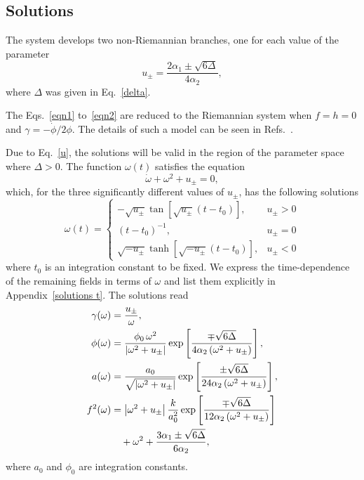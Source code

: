 \documentclass[aps,prd,12pt,superscriptaddress,showpacs,showkeys,longbibliography,reprint,nofootinbib]{revtex4-1}
\begin{document}
\subsection{Solutions\label{sec:sol}}

The system develops two non-Riemannian branches, one for each value of the parameter
\begin{equation}
  \label{u}
  u_\pm=\frac{2\alpha_1\pm\sqrt{6\Delta}}{4\alpha_2},
\end{equation}
where $\Delta$ was given in Eq.~\eqref{delta}.

The Eqs.~\eqref{eqn1} to~\eqref{eqn2} are reduced to the Riemannian system when \mbox{$f=h=0$} and \mbox{$\gamma=-\dot{\phi}/2\phi$}. The details of such a model can be seen in Refs.~\cite{Deruelle:1986iv,Deruelle:2003ck,Henriques:1986jw,*Ishihara:1986if,Kleidis:1997mu,Canfora:2016umq}.

Due to Eq.~\eqref{u}, the solutions will be valid in the region of the parameter space where $\Delta>0$. The function $\omega(t)$ satisfies the equation
\begin{equation}
  \dot{\omega}+\omega^2+u_{\pm} = 0,
\end{equation}
which, for the three significantly different values of $u_\pm$, has the following solutions
\begin{equation}
  \omega(t) =
  \begin{cases}
    -\sqrt{u_\pm}\tan\left[\sqrt{u_\pm}\left(t-t_0\right)\right], & u_\pm > 0 \\
    \left(t-t_0\right)^{-1}, & u_\pm = 0 \\
    \sqrt{-u_\pm}\tanh\left[\sqrt{-u_\pm}\left(t-t_0\right)\right], & u_\pm < 0
  \end{cases}
\end{equation}
where $t_0$ is an integration constant to be fixed. We express the time-dependence of the remaining fields in terms of $\omega$ and list them explicitly in Appendix~\ref{solutions t}. The solutions read
\begin{align}
  \gamma(\omega)&=\frac{u_\pm}{\omega},\\
  \phi(\omega)&=\frac{\phi_0\,\omega^2}{\left|\omega^2+u_\pm\right|}\exp\left[\frac{\mp\sqrt{6\Delta}}{4\alpha_2\left(\omega^2+u_\pm\right)}\right],\\
  a(\omega)&=\frac{a_0}{\sqrt{\left|\omega^2+u_\pm\right|}}\exp\left[\frac{\pm\sqrt{6\Delta}} {24\alpha_2\left(\omega^2+u_\pm\right)}\right],\\
  \label{f2sol}
  f^2(\omega)&=\left|\omega^2+u_\pm\right|\frac{k}{a_0^2}\exp\left[\frac{\mp\sqrt{6\Delta}}{12\alpha_2\left(\omega^2+u_\pm\right)}\right]\notag\\
  & \quad +\omega^2  + \frac{3\alpha_1\pm\sqrt{6\Delta}}{6\alpha_2},
\end{align}
where $a_0$ and $\phi_0$ are integration constants. 
\end{document}
